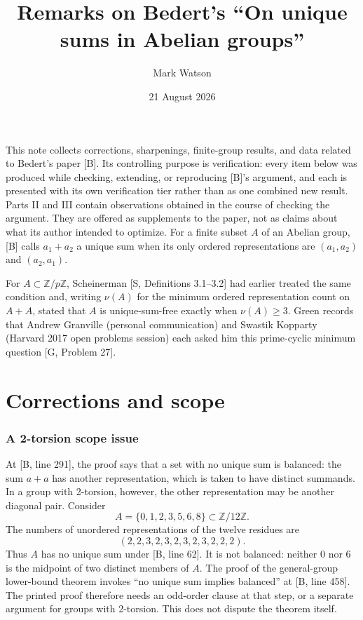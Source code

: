 \documentclass[10pt]{article}
\title{Remarks on Bedert's ``On unique sums in Abelian groups''}
\author{Mark Watson}
\date{21 August 2026}
\newcommand{\ZZ}{\mathbb Z}
\theoremstyle{plain}
\begin{document}
\maketitle

This note collects corrections, sharpenings, finite-group results, and data
related to Bedert's paper [B]. Its controlling purpose is verification: every
item below was produced while checking, extending, or reproducing [B]'s
argument, and each is presented with its own verification tier rather than as
one combined new result. Parts II and III contain observations obtained
in the course of checking the argument. They are offered as supplements to
the paper, not as claims about what its author intended to optimize. For a
finite subset $A$ of an Abelian group, [B] calls $a_1+a_2$ a unique sum when
its only ordered representations are $(a_1,a_2)$ and $(a_2,a_1)$.

For $A\subset\ZZ/p\ZZ$, Scheinerman [S, Definitions 3.1--3.2] had earlier
treated the same condition and, writing $\nu(A)$ for the minimum ordered
representation count on $A+A$, stated that $A$ is unique-sum-free exactly
when $\nu(A)\geq3$. Green records that Andrew Granville (personal
communication) and Swastik Kopparty (Harvard 2017 open problems session)
each asked him this prime-cyclic minimum question [G, Problem 27].

\part{Corrections and scope}

\section{A 2-torsion scope issue}

At [B, line 291], the proof says that a set with no unique sum is balanced:
the sum $a+a$ has another representation, which is taken to have distinct
summands. In a group with 2-torsion, however, the other representation may be
another diagonal pair. Consider
\[
 A=\{0,1,2,3,5,6,8\}\subset \ZZ/12\ZZ.
\]
The numbers of unordered representations of the twelve residues are
\[
(2,2,3,2,3,2,3,2,3,2,2,2).
\]
Thus $A$ has no unique sum under [B, line 62]. It is not balanced: neither
$0$ nor $6$ is the midpoint of two distinct members of $A$. The proof of the
general-group lower-bound theorem invokes ``no unique sum implies balanced''
at [B, line 458]. The printed proof therefore needs an odd-order clause at
that step, or a separate argument for groups with 2-torsion. This does not
dispute the theorem itself.
\end{document}
